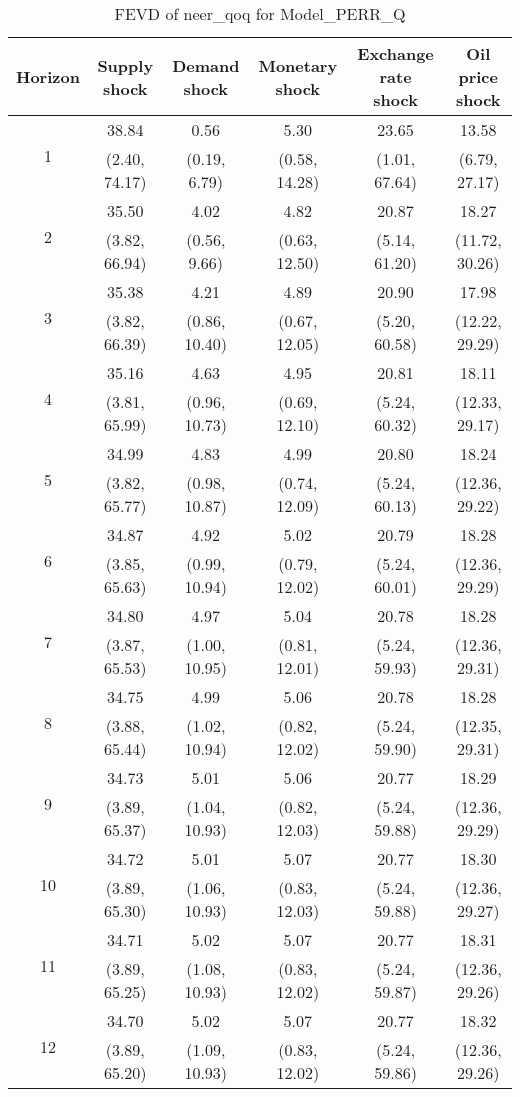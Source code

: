 \documentclass{article}
\begin{document}
\begin{table}
	\footnotesize
	\caption{FEVD of neer_qoq for Model_PERR_Q}
	\begin{tabular}{cccccc}
		Horizon & Supply shock & Demand shock & Monetary shock & Exchange rate shock & Oil price shock\\ \hline
		\multirow{2}{*}{1} & 38.84 & 0.56 & 5.30 & 23.65 & 13.58\\
		 & (2.40, 74.17) & (0.19, 6.79) & (0.58, 14.28) & (1.01, 67.64) & (6.79, 27.17)\\
		\multirow{2}{*}{2} & 35.50 & 4.02 & 4.82 & 20.87 & 18.27\\
		 & (3.82, 66.94) & (0.56, 9.66) & (0.63, 12.50) & (5.14, 61.20) & (11.72, 30.26)\\
		\multirow{2}{*}{3} & 35.38 & 4.21 & 4.89 & 20.90 & 17.98\\
		 & (3.82, 66.39) & (0.86, 10.40) & (0.67, 12.05) & (5.20, 60.58) & (12.22, 29.29)\\
		\multirow{2}{*}{4} & 35.16 & 4.63 & 4.95 & 20.81 & 18.11\\
		 & (3.81, 65.99) & (0.96, 10.73) & (0.69, 12.10) & (5.24, 60.32) & (12.33, 29.17)\\
		\multirow{2}{*}{5} & 34.99 & 4.83 & 4.99 & 20.80 & 18.24\\
		 & (3.82, 65.77) & (0.98, 10.87) & (0.74, 12.09) & (5.24, 60.13) & (12.36, 29.22)\\
		\multirow{2}{*}{6} & 34.87 & 4.92 & 5.02 & 20.79 & 18.28\\
		 & (3.85, 65.63) & (0.99, 10.94) & (0.79, 12.02) & (5.24, 60.01) & (12.36, 29.29)\\
		\multirow{2}{*}{7} & 34.80 & 4.97 & 5.04 & 20.78 & 18.28\\
		 & (3.87, 65.53) & (1.00, 10.95) & (0.81, 12.01) & (5.24, 59.93) & (12.36, 29.31)\\
		\multirow{2}{*}{8} & 34.75 & 4.99 & 5.06 & 20.78 & 18.28\\
		 & (3.88, 65.44) & (1.02, 10.94) & (0.82, 12.02) & (5.24, 59.90) & (12.35, 29.31)\\
		\multirow{2}{*}{9} & 34.73 & 5.01 & 5.06 & 20.77 & 18.29\\
		 & (3.89, 65.37) & (1.04, 10.93) & (0.82, 12.03) & (5.24, 59.88) & (12.36, 29.29)\\
		\multirow{2}{*}{10} & 34.72 & 5.01 & 5.07 & 20.77 & 18.30\\
		 & (3.89, 65.30) & (1.06, 10.93) & (0.83, 12.03) & (5.24, 59.88) & (12.36, 29.27)\\
		\multirow{2}{*}{11} & 34.71 & 5.02 & 5.07 & 20.77 & 18.31\\
		 & (3.89, 65.25) & (1.08, 10.93) & (0.83, 12.02) & (5.24, 59.87) & (12.36, 29.26)\\
		\multirow{2}{*}{12} & 34.70 & 5.02 & 5.07 & 20.77 & 18.32\\
		 & (3.89, 65.20) & (1.09, 10.93) & (0.83, 12.02) & (5.24, 59.86) & (12.36, 29.26)\\
	\end{tabular}
\label{tab:fevd-Model_PERR_Q-neer_qoq}
\end{table}
\end{document}
